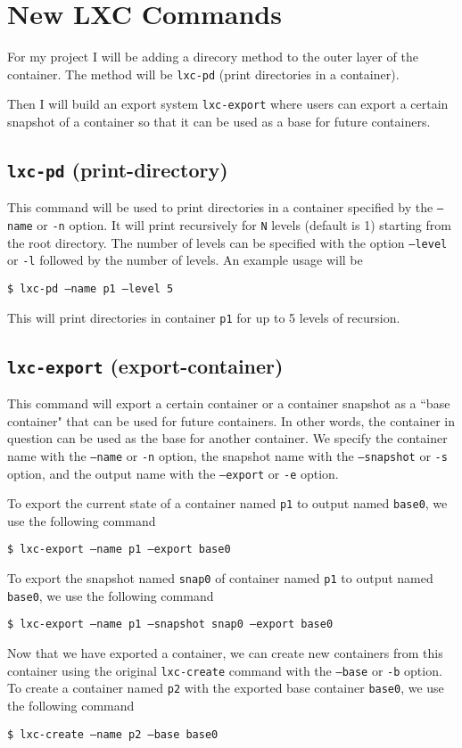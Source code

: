 \documentclass[12pt]{article}
\begin{document}
\section{New LXC Commands}

For my project I will be adding a direcory method to the outer layer of the container. The method will be \texttt{lxc-pd} (print directories in a container).

Then I will build an export system \texttt{lxc-export} where users can export a certain snapshot of a container so that it can be used as a base for future containers.

\subsection{\texttt{lxc-pd} (print-directory)}

This command will be used to print directories in a container specified by the \texttt{--name} or \texttt{-n} option. It will print recursively for \texttt{N} levels (default is 1) starting from the root directory. The number of levels can be specified with the option \texttt{--level} or \texttt{-l} followed by the number of levels. An example usage will be

\texttt{\$ lxc-pd --name p1 --level 5}

\noindent This will print directories in container \texttt{p1} for up to 5 levels of recursion.

\subsection{\texttt{lxc-export} (export-container)}

This command will export a certain container or a container snapshot as a ``base container" that can be used for future containers. In other words, the container in question can be used as the base for another container. We specify the container name with the \texttt{--name} or \texttt{-n} option, the snapshot name with the \texttt{--snapshot} or \texttt{-s} option, and the output name with the \texttt{--export} or \texttt{-e} option.

\noindent To export the current state of a container named \texttt{p1} to output named \texttt{base0}, we use the following command

\texttt{\$ lxc-export --name p1 --export base0}

\noindent To export the snapshot named \texttt{snap0} of container named \texttt{p1} to output named \texttt{base0}, we use the following command

\texttt{\$ lxc-export --name p1 --snapshot snap0 --export base0}

\noindent Now that we have exported a container, we can create new containers from this container using the original \texttt{lxc-create} command with the \texttt{--base} or \texttt{-b} option. To create a container named \texttt{p2} with the exported base container \texttt{base0}, we use the following command

\texttt{\$ lxc-create --name p2 --base base0}
\end{document}
